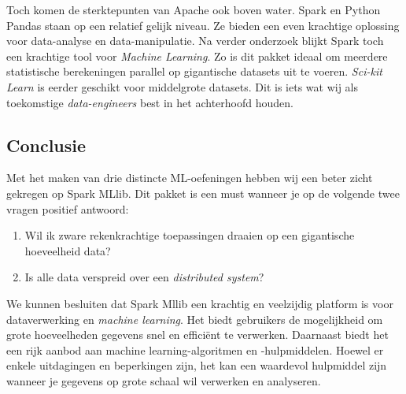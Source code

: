 \documentclass[a4paper,10pt,twoside]{report}
\begin{document}
Toch komen de sterktepunten van Apache ook boven water. Spark en Python Pandas staan op een relatief gelijk niveau. Ze bieden een even krachtige oplossing voor data-analyse en data-manipulatie. Na verder onderzoek blijkt Spark toch een krachtige tool voor \textit{Machine Learning}. Zo is dit pakket ideaal om meerdere statistische berekeningen parallel op gigantische datasets uit te voeren. \textit{Sci-kit Learn} is eerder geschikt voor middelgrote datasets. Dit is iets wat wij als toekomstige \textit{data-engineers} best in het achterhoofd houden.

\subsection*{Conclusie}

Met het maken van drie distincte ML-oefeningen hebben wij een beter zicht gekregen op Spark MLlib. Dit pakket is een must wanneer je op de volgende twee vragen positief antwoord: 
\begin{enumerate}
	\item Wil ik zware rekenkrachtige toepassingen draaien op een gigantische hoeveelheid data?
	\item Is alle data verspreid over een \textit{distributed system}?
\end{enumerate}

We kunnen besluiten dat Spark Mllib een krachtig en veelzijdig platform is voor dataverwerking en \textit{machine learning}. Het biedt gebruikers de mogelijkheid om grote hoeveelheden gegevens snel en efficiënt te verwerken. Daarnaast biedt het een rijk aanbod aan machine learning-algoritmen en -hulpmiddelen. Hoewel er enkele uitdagingen en beperkingen zijn, het kan een waardevol hulpmiddel zijn wanneer je gegevens op grote schaal wil verwerken en analyseren.

\appendix
\end{document}
